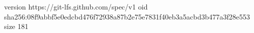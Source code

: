 version https://git-lfs.github.com/spec/v1
oid sha256:08f9abbf5e0edcbd476f72938a87b2e75e7831f40eb3a5acbd3b477a3f28e553
size 181
